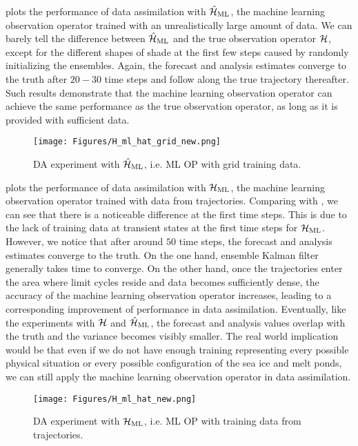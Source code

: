 \par {} plots the performance of data assimilation with $\hat{\mathcal{H}}_{\text{ML}}$, the machine learning observation operator trained with an unrealistically large amount of data. We can barely tell the difference between $\hat{\mathcal{H}}_{\text{ML}}$ and the true observation operator $\mathcal{H}$, except for the different shapes of shade at the first few steps caused by randomly initializing the ensembles. Again, the forecast and analysis estimates converge to the truth after $20-30$ time steps and follow along the true trajectory thereafter. Such results demonstrate that the machine learning observation operator can achieve the same performance as the true observation operator, as long as it is provided with sufficient data.

\begin{figure}\label{fig:hmlhatDA}
\begin{center}
\texttt{[image: Figures/H\_ml\_hat\_grid\_new.png]} 
\end{center}
\caption{DA experiment with $\hat{\mathcal{H}}_{\text{ML}}$, i.e. ML OP with grid training data.}
\end{figure}

\par {} plots the performance of data assimilation with $\mathcal{H}_{\text{ML}}$, the machine learning observation operator trained with data from trajectories. Comparing  with , we can see that there is a noticeable difference at the first time steps. This is due to the lack of training data at transient states at the first time steps for $\mathcal{H}_{\text{ML}}$. However, we notice that after around $50$ time steps, the forecast and analysis estimates converge to the truth. On the one hand, ensemble Kalman filter generally takes time to converge. On the other hand, once the trajectories enter the area where limit cycles reside and data becomes sufficiently dense, the accuracy of the machine learning observation operator increases, leading to a corresponding improvement of performance in data assimilation. Eventually, like the experiments with $\mathcal{H}$ and $\hat{\mathcal{H}}_{\text{ML}}$, the forecast and analysis values overlap with the truth and the variance becomes visibly smaller. The real world implication would be that even if we do not have enough training representing every possible physical situation or every possible configuration of the sea ice and melt ponds, we can still apply the machine learning observation operator in data assimilation.

\begin{figure}\label{fig:hmlDA}
\begin{center}
\texttt{[image: Figures/H\_ml\_hat\_new.png]} 
\end{center}
\caption{DA experiment with $\mathcal{H}_{\text{ML}}$, i.e. ML OP with training data from trajectories.}
\end{figure}

